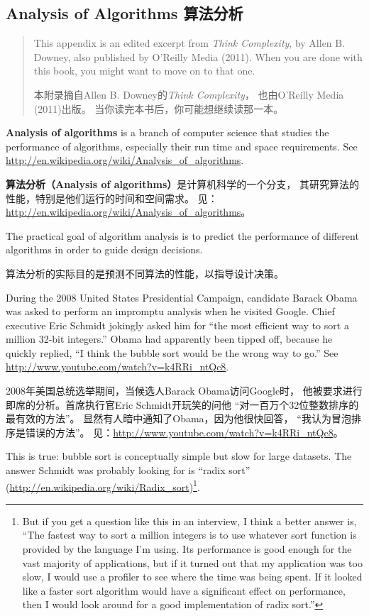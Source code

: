 \documentclass[10pt]{book}
\begin{document}
\begin{CJK}{UTF8}{gbsn}
\chapter{Analysis of Algorithms 算法分析}

\begin{quote}
This appendix is an edited excerpt from {\it Think Complexity}, by
Allen B. Downey, also published by O'Reilly Media (2011).  When you
are done with this book, you might want to move on to that one.

本附录摘自Allen B. Downey的{\it Think Complexity}，
也由O'Reilly Media (2011)出版。
当你读完本书后，你可能想继续读那一本。
\end{quote}

{\bf Analysis of algorithms} is a branch of computer science that
studies the performance of algorithms, especially their run time and
space requirements.  See
\url{http://en.wikipedia.org/wiki/Analysis_of_algorithms}.
 

{\bf 算法分析（Analysis of algorithms）}是计算机科学的一个分支，
其研究算法的性能，特别是他们运行的时间和空间需求。
见：\url{http://en.wikipedia.org/wiki/Analysis_of_algorithms}。

The practical goal of algorithm analysis is to predict the performance
of different algorithms in order to guide design decisions.

算法分析的实际目的是预测不同算法的性能，以指导设计决策。

During the 2008 United States Presidential Campaign, candidate
Barack Obama was asked to perform an impromptu analysis when
he visited Google.  Chief executive Eric Schmidt jokingly asked him
for ``the most efficient way to sort a million 32-bit integers.''
Obama had apparently been tipped off, because he quickly
replied, ``I think the bubble sort would be the wrong way to go.''
See \url{http://www.youtube.com/watch?v=k4RRi_ntQc8}.

2008年美国总统选举期间，当候选人Barack Obama访问Google时，
他被要求进行即席的分析。首席执行官Eric Schmidt开玩笑的问他
``对一百万个32位整数排序的最有效的方法''。
显然有人暗中通知了Obama，因为他很快回答，
``我认为冒泡排序是错误的方法''。
见：\url{http://www.youtube.com/watch?v=k4RRi_ntQc8}。

This is true: bubble sort is conceptually simple but slow for
large datasets.  The answer Schmidt was probably looking for is
``radix sort'' (\url{http://en.wikipedia.org/wiki/Radix_sort})\footnote{
But if you get a question like this in an interview, I think
a better answer is, ``The fastest way to sort a million integers
is to use whatever sort function is provided by the language
I'm using.  Its performance is good enough for the vast majority
of applications, but if it turned out that my application was too
slow, I would use a profiler to see where the time was being
spent.  If it looked like a faster sort algorithm would have
a significant effect on performance, then I would look
around for a good implementation of radix sort.''}.


\end{CJK}
\end{document}
